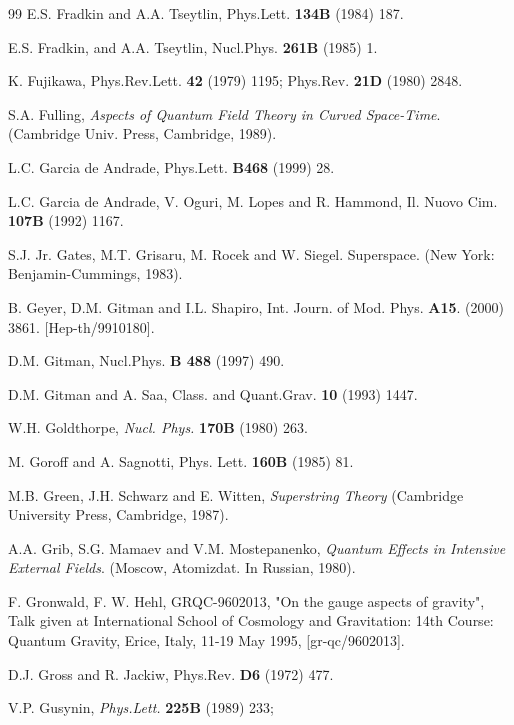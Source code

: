\begin{thebibliography}{99}
E.S. Fradkin and A.A. Tseytlin, Phys.Lett. {\bf 134B} (1984) 187.

E.S. Fradkin, and  A.A. Tseytlin,  Nucl.Phys. {\bf 261B} (1985) 1.

 K. Fujikawa, Phys.Rev.Lett. {\bf 42} (1979) 1195;
 Phys.Rev. {\bf 21D} (1980) 2848.

S.A. Fulling, {\sl Aspects of Quantum Field Theory in Curved Space-Time}. 
(Cambridge Univ. Press, Cambridge, 1989).

 L.C. Garcia de Andrade,  
Phys.Lett. {\bf B468} (1999) 28.

L.C. Garcia de Andrade, V. Oguri, M. Lopes 
and R. Hammond, Il. Nuovo Cim. {\bf 107B} (1992) 1167.

 S.J. Jr. Gates, M.T. Grisaru, M. Rocek and W. Siegel.
Superspace. (New York: Benjamin-Cummings, 1983).

B. Geyer, D.M. Gitman and I.L. Shapiro,
Int. Journ. of Mod. Phys. {\bf A15}. (2000) 3861. %
[Hep-th/9910180]. 

D.M. Gitman, {Nucl.Phys.} {\bf B 488} (1997) 490.

D.M. Gitman and A. Saa, {Class. and Quant.Grav.}
{\bf 10} (1993) 1447.

W.H. Goldthorpe, {\sl Nucl. Phys.} {\bf 170B} (1980) 263.

 M. Goroff and A. Sagnotti,
Phys. Lett. {\bf 160B} (1985) 81.

 M.B. Green, J.H. Schwarz  and E. Witten,
{\it Superstring Theory} (Cambridge University Press, Cambridge, 1987).

 A.A. Grib,  S.G. Mamaev and V.M. Mostepanenko,
{\sl Quantum Effects in Intensive External Fields}. (Moscow,
Atomizdat. In Russian, 1980).

 F. Gronwald, F. W. Hehl, GRQC-9602013,
"On the gauge aspects of gravity", Talk given at International
School of Cosmology and Gravitation: 14th Course: Quantum Gravity,
Erice, Italy, 11-19 May 1995, [gr-qc/9602013].

 D.J. Gross and R. Jackiw, Phys.Rev. {\bf D6} (1972) 477.

 V.P. Gusynin, {\sl Phys.Lett.} {\bf 225B} (1989) 233;


\end{thebibliography}
